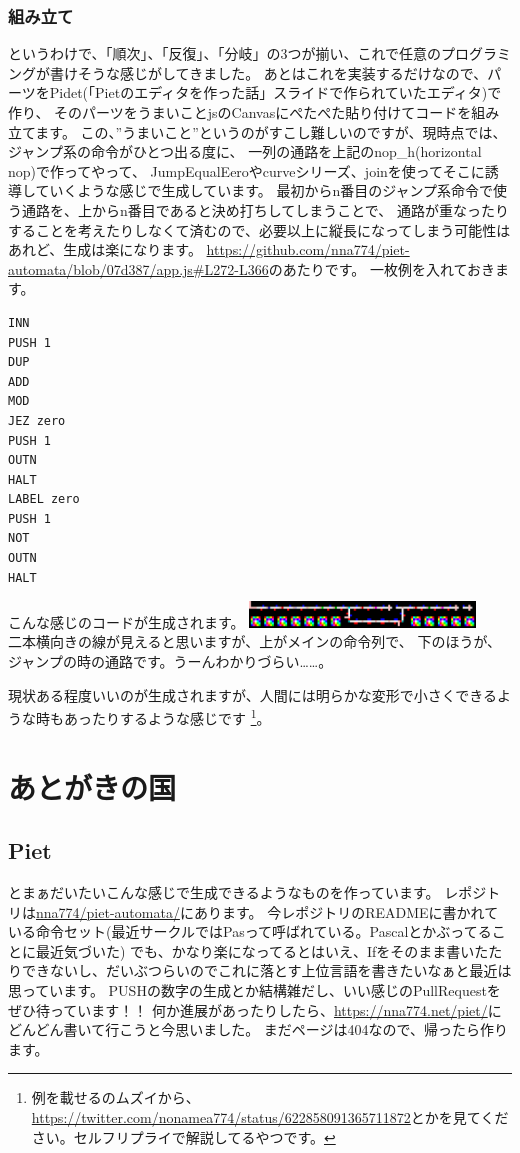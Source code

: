 \documentclass[twocolumn,8pt,b5paper]{extarticle}
\begin{document}
\subsubsection{組み立て}
というわけで、「順次」、「反復」、「分岐」の3つが揃い、これで任意のプログラミングが書けそうな感じがしてきました。
あとはこれを実装するだけなので、パーツをPidet(「Pietのエディタを作った話」スライドで作られていたエディタ)で作り、
そのパーツをうまいことjsのCanvasにぺたぺた貼り付けてコードを組み立てます。
この、”うまいこと”というのがすこし難しいのですが、現時点では、ジャンプ系の命令がひとつ出る度に、
一列の通路を上記のnop\_h(horizontal nop)で作ってやって、
JumpEqualEeroやcurveシリーズ、joinを使ってそこに誘導していくような感じで生成しています。
最初からn番目のジャンプ系命令で使う通路を、上からn番目であると決め打ちしてしまうことで、
通路が重なったりすることを考えたりしなくて済むので、必要以上に縦長になってしまう可能性はあれど、生成は楽になります。
\url{https://github.com/nna774/piet-automata/blob/07d387/app.js#L272-L366}のあたりです。
一枚例を入れておきます。
\begin{lstlisting}[frame=single]
INN
PUSH 1
DUP
ADD
MOD
JEZ zero
PUSH 1
OUTN
HALT
LABEL zero
PUSH 1
NOT
OUTN
HALT
\end{lstlisting}
こんな感じのコードが生成されます。
\includegraphics[width=6cm,clip]{images/even-or-odd.png}\\
二本横向きの線が見えると思いますが、上がメインの命令列で、
下のほうが、ジャンプの時の通路です。うーんわかりづらい……。

現状ある程度いいのが生成されますが、人間には明らかな変形で小さくできるような時もあったりするような感じです 
\footnote{例を載せるのムズイから、\url{https://twitter.com/nonamea774/status/622858091365711872}とかを見てください。セルフリプライで解説してるやつです。}。

\section{あとがきの国}
\subsection{Piet}
とまぁだいたいこんな感じで生成できるようなものを作っています。
レポジトリは\href{https://github.com/nna774/piet-automata/}{nna774/piet-automata/}にあります。
今レポジトリのREADMEに書かれている命令セット(最近サークルではPasって呼ばれている。Pascalとかぶってることに最近気づいた)
でも、かなり楽になってるとはいえ、Ifをそのまま書いたたりできないし、だいぶつらいのでこれに落とす上位言語を書きたいなぁと最近は思っています。
PUSHの数字の生成とか結構雑だし、いい感じのPullRequestをぜひ待っています！！
何か進展があったりしたら、\url{https://nna774.net/piet/}にどんどん書いて行こうと今思いました。
まだページは404なので、帰ったら作ります。
\end{document}
